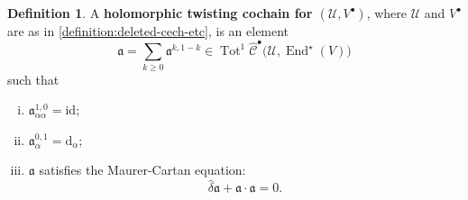 \documentclass[11pt,fleqn]{article}
\theoremstyle{plain}
\theoremstyle{definition}
\newtheorem{definition}[theorem]{Definition}
\theoremstyle{remark}
\numberwithin{equation}{theorem}
\newcommand{\cover}{\mathcal{U}}
\newcommand{\anotherbullet}{\star}
\newcommand{\id}{\mathrm{id}}
\newcommand{\cechd}{\hat{\mathscr{C}}}
\newcommand{\twc}{\mathfrak{a}}
\newcommand{\define}[1]{\textbf{#1}}
\renewcommand{\d}{\mathrm{d}}
\DeclareMathOperator{\End}{End}
\DeclareMathOperator{\Tot}{Tot}
\begin{document}
        \begin{definition}\label{definition:holomorphic-twisted-cochain}
            A \define{holomorphic twisting cochain for $(\cover,V^\bullet)$}, where $\cover$ and $V^\bullet$ are as in \cref{definition:deleted-cech-etc}, is an element
            \begin{equation*}
                \twc=\sum_{k\geqslant0}\twc^{k,1-k}\in\Tot^1\cechd^\bullet\big(\cover,\End^\anotherbullet(V)\big)
            \end{equation*}
            such that
            \begin{enumerate}[(i)]
                \item $\twc^{1,0}_{\alpha\alpha}=\id$;
                \item $\twc^{0,1}_\alpha=\d_\alpha$;
                \item $\twc$ satisfies the Maurer-Cartan equation:
                    \[
                        \hat{\delta}\twc+\twc\cdot\twc=0.
                    \]
            \end{enumerate}
        \end{definition}
\end{document}
